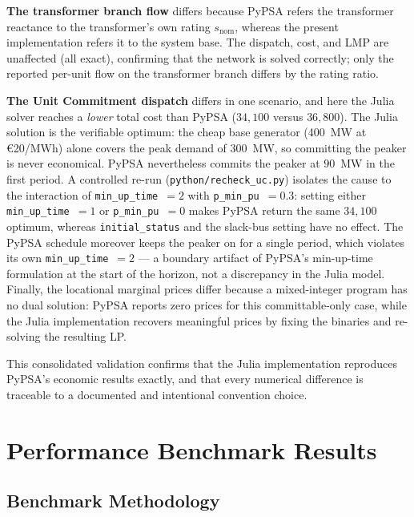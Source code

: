 \textbf{The transformer branch flow} differs because PyPSA refers the transformer reactance to the transformer's own rating $s_\text{nom}$, whereas the present implementation refers it to the system base. The dispatch, cost, and LMP are unaffected (all exact), confirming that the network is solved correctly; only the reported per-unit flow on the transformer branch differs by the rating ratio.

\textbf{The Unit Commitment dispatch} differs in one scenario, and here the Julia solver reaches a \emph{lower} total cost than PyPSA ($34{,}100$ versus $36{,}800$). The Julia solution is the verifiable optimum: the cheap base generator (400~MW at \euro20/MWh) alone covers the peak demand of 300~MW, so committing the peaker is never economical. PyPSA nevertheless commits the peaker at $90$~MW in the first period. A controlled re-run (\texttt{python/recheck\_uc.py}) isolates the cause to the interaction of \texttt{min\_up\_time}~$=2$ with \texttt{p\_min\_pu}~$=0.3$: setting either \texttt{min\_up\_time}~$=1$ or \texttt{p\_min\_pu}~$=0$ makes PyPSA return the same $34{,}100$ optimum, whereas \texttt{initial\_status} and the slack-bus setting have no effect. The PyPSA schedule moreover keeps the peaker on for a single period, which violates its own \texttt{min\_up\_time}~$=2$ --- a boundary artifact of PyPSA's min-up-time formulation at the start of the horizon, not a discrepancy in the Julia model. Finally, the locational marginal prices differ because a mixed-integer program has no dual solution: PyPSA reports zero prices for this committable-only case, while the Julia implementation recovers meaningful prices by fixing the binaries and re-solving the resulting LP.

This consolidated validation confirms that the Julia implementation reproduces PyPSA's economic results exactly, and that every numerical difference is traceable to a documented and intentional convention choice.

\section{Performance Benchmark Results}

\subsection{Benchmark Methodology}
\label{sec:bench_methodology}

